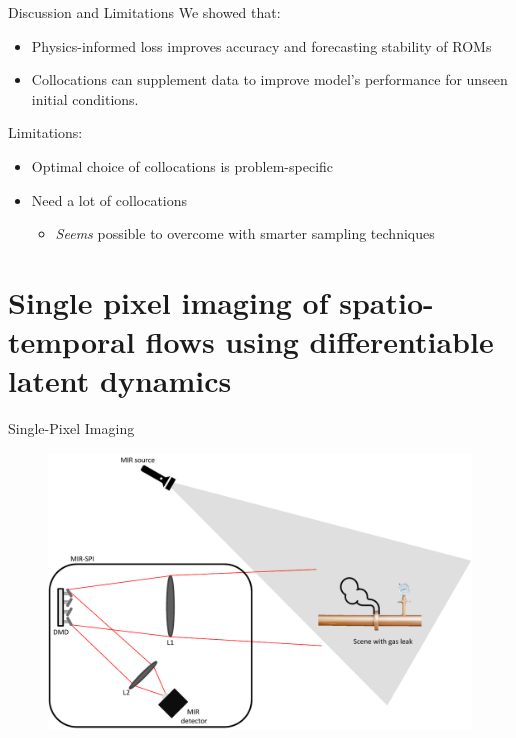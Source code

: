 \documentclass[8pt]{beamer}
\begin{document}
\begin{frame}{Discussion and Limitations}
We showed that:
\begin{itemize}
	\item Physics-informed loss improves accuracy and forecasting stability of ROMs
	\item Collocations can supplement data to improve model's performance for unseen initial conditions.
\end{itemize}
\vspace{2em}
Limitations:
\begin{itemize}
	\item Optimal choice of collocations is problem-specific
	\item Need a lot of collocations
	\begin{itemize}
		\item \textit{Seems} possible to overcome with smarter sampling techniques
	\end{itemize}
\end{itemize}
\end{frame}

\section{Single pixel imaging of spatio-temporal flows using differentiable latent dynamics}

\begin{frame}{Single-Pixel Imaging}
\begin{figure}
	\includegraphics[width=\textwidth]{Figures/SPI_setup.pdf}
\end{figure}
\end{frame}
\end{document}
